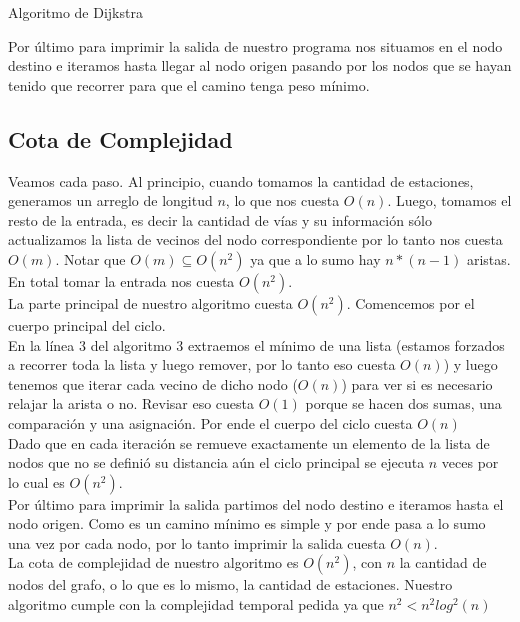 \begin{algorithm}[H]
	\label{algo: pseudocodigo_ej3_dijsktra}
	\caption{Algoritmo de Dijkstra}
\end{algorithm}

Por \'ultimo para imprimir la salida de nuestro programa nos situamos en el nodo destino e iteramos hasta llegar al nodo origen pasando por los nodos que se hayan tenido que recorrer para que el camino tenga peso m\'inimo.

\subsection{Cota de Complejidad}
Veamos cada paso. Al principio, cuando tomamos la cantidad de estaciones, generamos un arreglo de longitud $n$, lo que nos cuesta $O(n)$. Luego, tomamos el resto de la entrada, es decir la cantidad de v\'ias y su informaci\'on s\'olo actualizamos la lista de vecinos del nodo correspondiente por lo tanto nos cuesta $O(m)$. Notar que $O(m) \subseteq O(n^2)$ ya que a lo sumo hay $n*(n-1)$ aristas. En total tomar la entrada nos cuesta $O(n^2)$. \\
La parte principal de nuestro algoritmo cuesta $O(n^2)$. Comencemos por el cuerpo principal del ciclo. \\
En la l\'inea 3 del algoritmo 3 extraemos el m\'inimo de una lista (estamos forzados a recorrer toda la lista y luego remover, por lo tanto eso cuesta $O(n)$) y luego tenemos que iterar cada vecino de dicho nodo ($O(n)$) para ver si es necesario relajar la arista o no. Revisar eso cuesta $O(1)$ porque se hacen dos sumas, una comparaci\'on y una asignaci\'on. Por ende el cuerpo del ciclo cuesta $O(n)$ \\
Dado que en cada iteraci\'on se remueve exactamente un elemento de la lista de nodos que no se defini\'o su distancia a\'un el ciclo principal se ejecuta $n$ veces por lo cual es $O(n^2)$.\\
Por \'ultimo para imprimir la salida partimos del nodo destino e iteramos hasta el nodo origen. Como es un camino m\'inimo es simple y por ende pasa a lo sumo una vez por cada nodo, por lo tanto imprimir la salida cuesta $O(n)$. \\
La cota de complejidad de nuestro algoritmo es $O(n^2)$, con $n$ la cantidad de nodos del grafo, o lo que es lo mismo, la cantidad de estaciones.
Nuestro algoritmo cumple con la complejidad temporal pedida ya que $n^2 <n^2 log^2(n)$

